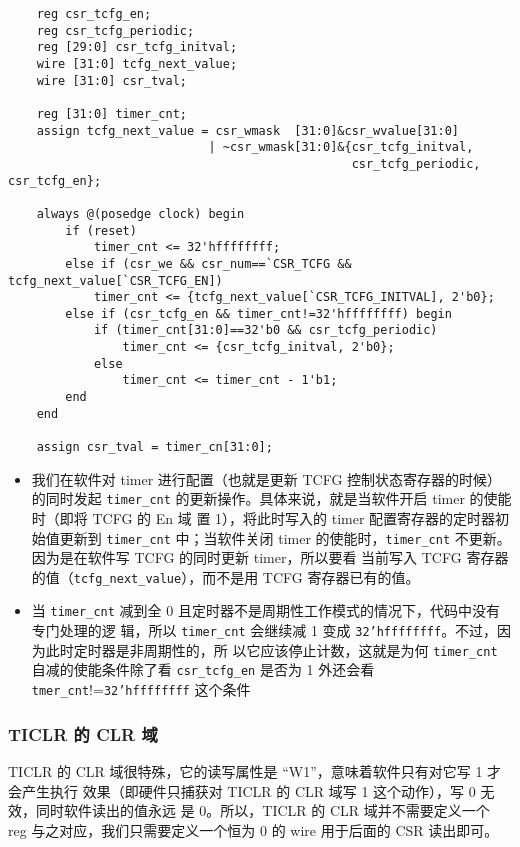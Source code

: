 \begin{lstlisting}
    reg csr_tcfg_en;
    reg csr_tcfg_periodic;
    reg [29:0] csr_tcfg_initval;
    wire [31:0] tcfg_next_value;
    wire [31:0] csr_tval;

    reg [31:0] timer_cnt;
    assign tcfg_next_value = csr_wmask  [31:0]&csr_wvalue[31:0]
                            | ~csr_wmask[31:0]&{csr_tcfg_initval,
                                                csr_tcfg_periodic, csr_tcfg_en};

    always @(posedge clock) begin
        if (reset)
            timer_cnt <= 32'hffffffff;
        else if (csr_we && csr_num==`CSR_TCFG && tcfg_next_value[`CSR_TCFG_EN])
            timer_cnt <= {tcfg_next_value[`CSR_TCFG_INITVAL], 2'b0};
        else if (csr_tcfg_en && timer_cnt!=32'hffffffff) begin
            if (timer_cnt[31:0]==32'b0 && csr_tcfg_periodic)
                timer_cnt <= {csr_tcfg_initval, 2'b0};
            else
                timer_cnt <= timer_cnt - 1'b1;
        end
    end

    assign csr_tval = timer_cn[31:0];      
\end{lstlisting}

\begin{itemize}
    \item 我们在软件对 timer 进行配置（也就是更新 TCFG 控制状态寄存器的时候）的同时发起
    \texttt{timer\_cnt} 的更新操作。具体来说，就是当软件开启 timer 的使能时（即将 TCFG 的 En 域
    置 1），将此时写入的 timer 配置寄存器的定时器初始值更新到 \texttt{timer\_cnt} 中；当软件关闭
    timer 的使能时，\texttt{timer\_cnt} 不更新。因为是在软件写 TCFG 的同时更新 timer，所以要看
    当前写入 TCFG 寄存器的值（\texttt{tcfg\_next\_value}），而不是用 TCFG 寄存器已有的值。
    \item 当 \texttt{timer\_cnt} 减到全 0 且定时器不是周期性工作模式的情况下，代码中没有专门处理的逻
    辑，所以 \texttt{timer\_cnt} 会继续减 1 变成 \texttt{32'hffffffff}。不过，因为此时定时器是非周期性的，所
    以它应该停止计数，这就是为何 \texttt{timer\_cnt} 自减的使能条件除了看 \texttt{csr\_tcfg\_en} 是否为 1
    外还会看 \texttt{tmer\_cnt}!=\texttt{32'hffffffff} 这个条件         
\end{itemize}

\subsubsection{TICLR 的 CLR 域}

TICLR 的 CLR 域很特殊，它的读写属性是 ``W1''，意味着软件只有对它写 1 才会产生执行
效果（即硬件只捕获对 TICLR 的 CLR 域写 1 这个动作），写 0 无效，同时软件读出的值永远
是 0。所以，TICLR 的 CLR 域并不需要定义一个 reg 与之对应，我们只需要定义一个恒为 0 的
wire 用于后面的 CSR 读出即可。

